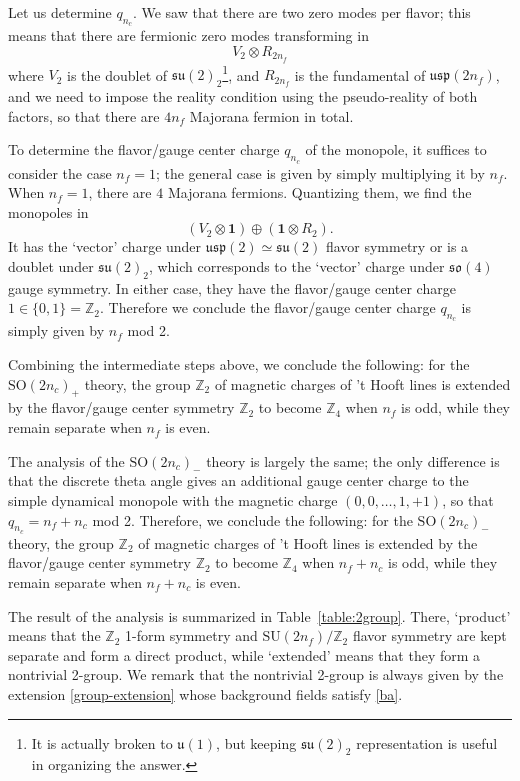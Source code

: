 \documentclass[12pt]{article}
\numberwithin{equation}{section}
\def\bZ{\mathbb{Z}}
\def\SU{\mathrm{SU}}
\def\SO{\mathrm{SO}}
\def\u{\mathfrak{u}}
\def\su{\mathfrak{su}}
\def\so{\mathfrak{so}}
\def\usp{\mathfrak{usp}}
\begin{document}
Let us determine $q_{n_c}$.
We saw that there are two zero modes per flavor; 
this means that there are fermionic zero modes transforming in \begin{equation}
V_{2} \otimes R_{2n_f} 
\end{equation} where $V_2$ is the doublet of $\su(2)_2$\footnote{
	It is actually broken to $\u(1)$, but keeping $\su(2)_2$ representation is useful in organizing the answer.
}, and
$R_{2n_f}$ is the fundamental of $\usp(2n_f)$,
and we need to impose the reality condition using the pseudo-reality of both factors,
so that there are $4n_f$ Majorana fermion in total.

To determine the flavor/gauge center charge $q_{n_c}$ of the monopole,
it suffices to consider the case $n_f=1$;
the general case is given by simply multiplying it by $n_f$.
When $n_f=1$, there are $4$ Majorana fermions.
Quantizing them, we find the monopoles in \begin{equation}
(V_2 \otimes \mathbf{1}) \oplus (\mathbf{1}\otimes R_2).
\end{equation}
It has the `vector' charge under $\usp(2)\simeq\su(2)$ flavor symmetry or is a doublet under $\su(2)_2$,
which corresponds to the `vector' charge under $\so(4)$ gauge symmetry.
In either case, they have the flavor/gauge center charge $1 \in \{0,1\}=\bZ_2$.
Therefore we conclude the flavor/gauge center charge $q_{n_c}$ is simply given by $n_f$ mod 2.

Combining the intermediate steps above, we conclude the following: 
for the $\SO(2n_c)_+$ theory,
the group $\bZ_2$ of magnetic charges of 't Hooft lines is extended by the flavor/gauge center symmetry $\bZ_2$ to become $\bZ_4$ when $n_f$ is odd,
while they remain separate when $n_f$ is even.

The analysis of the $\SO(2n_c)_-$ theory is largely the same;
the only difference is that the discrete theta angle gives an additional gauge center charge to the simple dynamical monopole with the magnetic charge $(0,0,\ldots,1,+1)$, so that $q_{n_c}=n_f+n_c$ mod 2.
Therefore, we conclude the following:
for the $\SO(2n_c)_-$ theory,
the group $\bZ_2$ of magnetic charges of 't Hooft lines is extended by the flavor/gauge center symmetry $\bZ_2$ to become $\bZ_4$ when $n_f+n_c$ is odd,
while they remain separate when $n_f+n_c$ is even.

The result of the analysis is summarized in Table~\ref{table:2group}.
There, `product' means that the $\bZ_2$ 1-form symmetry and $\SU(2n_f)/\bZ_2$ flavor symmetry are kept separate and form a direct product,
while `extended' means that they form a nontrivial 2-group.
We remark that the nontrivial 2-group is always given by the extension \eqref{group-extension}  whose background fields satisfy \eqref{ba}.
\end{document}
